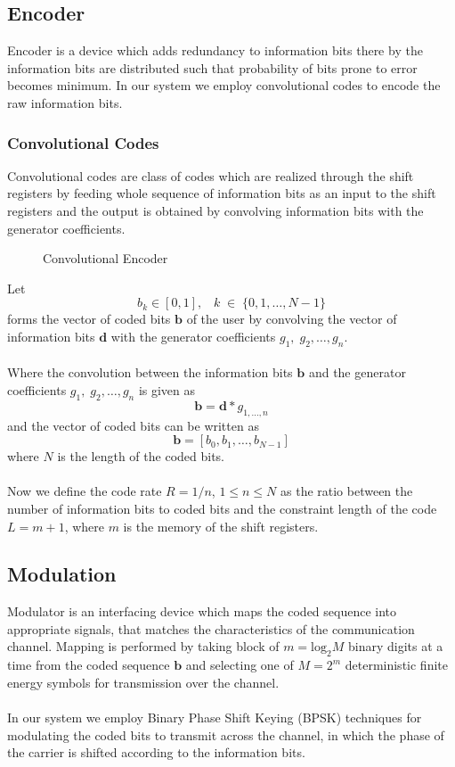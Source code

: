 \subsection{Encoder}
Encoder is a device which adds redundancy to information bits there by the information bits are distributed such that probability of bits prone to error becomes minimum. In our system we employ convolutional codes to encode the raw information bits.
\subsubsection{Convolutional Codes}
Convolutional codes are class of codes which are realized through the shift registers by feeding whole sequence of information bits as an input to the shift registers and the output is obtained by convolving information bits with the generator coefficients. 
\begin{figure}[htb]
\centerline{  }
\caption{Convolutional Encoder}
\end{figure}
Let
\begin{equation}
b_k\in[0,1],\;\;\;k\;\in\;\{0,1,\dots,N-1\}
\end{equation}
forms the vector of coded bits $\mathrm{\mathbf{b}}$ of the user by convolving the vector of information bits $\mathrm{\mathbf{d}}$ with the generator coefficients $g_1,\;g_2,\dots,g_n$. \\ \\
Where the convolution between the information bits $\mathrm{\mathbf{b}}$ and the generator coefficients $g_1,\;g_2,\dots,g_n$ is given as
\begin{equation}
\mathrm{\mathbf{b}}=\mathrm{\mathbf{d}}*g_{1,\dots,n}
\end{equation}
and the vector of coded bits can be written as
\begin{equation}
\mathrm{\mathbf{b}}=[b_0, b_1,\dots,b_{N-1}]
\end{equation}
where $N$ is the length of the coded bits.\\ \\
Now we define the code rate $R=1/n$, $1\leq n \leq N $ as the ratio between the number of information bits to coded bits and the constraint length of the code $L=m+1$, where $m$ is the memory of the shift registers.
\subsection{Modulation}
Modulator is an interfacing device which maps the coded sequence into appropriate signals, that matches the characteristics of the communication channel. Mapping is performed by taking block of $m=\mathrm{log_2}M$ binary digits at a time from the coded sequence $\mathrm{\mathbf{b}}$ and selecting one of $M=2^m$ deterministic finite energy symbols for transmission over the channel. \\ \\
In our system we employ Binary Phase Shift Keying (BPSK) techniques for modulating the coded bits to transmit across the channel, in which the phase of the carrier is shifted according to the information bits.
